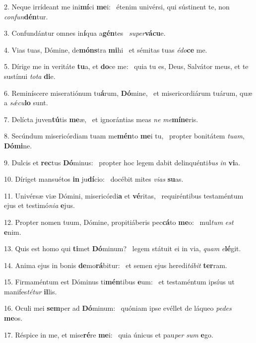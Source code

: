 2. Neque irrídeant me ini\textbf{mí}ci \textbf{me}i: \ast\  étenim univérsi, qui sústinent te, non \textit{con}\textit{fun}\textbf{dén}tur.\

3. Confundántur omnes in\textbf{í}qua a\textbf{gén}tes \ast\  \textit{su}\textit{per}\textbf{vá}\textbf{cu}e.\

4. Vias tuas, Dómine, de\textbf{móns}tra \textbf{mi}hi \ast\  et sémitas tuas \textit{é}\textit{do}\textbf{ce} me.\

5. Dírige me in veritáte \textbf{tu}a, et \textbf{do}ce me: \ast\  quia tu es, Deus, Salvátor meus, et te sustínui \textit{to}\textit{ta} \textbf{di}e.\

6. Reminíscere miseratiónum tu\textbf{á}rum, \textbf{Dó}mine, \ast\  et misericordiárum tuárum, quæ a \textit{sǽ}\textit{cu}\textbf{lo} sunt.\

7. Delícta juven\textbf{tú}tis \textbf{me}æ, \ast\  et ignorántias meas \textit{ne} \textit{me}\textbf{mí}\textbf{ne}ris.\

8. Secúndum misericórdiam tuam me\textbf{mén}to \textbf{me}i tu, \ast\  propter bonitátem \textit{tu}\textit{am}, \textbf{Dó}\textbf{mi}ne.\

9. Dulcis et \textbf{rec}tus \textbf{Dó}minus: \ast\  propter hoc legem dabit delinquénti\textit{bus} \textit{in} \textbf{vi}a.\

10. Díriget mansuétos \textbf{in} ju\textbf{dí}cio: \ast\  docébit mites \textit{vi}\textit{as} \textbf{su}as.\

11. Univérsæ viæ Dómini, misericórdi\textbf{a} et \textbf{vé}ritas, \ast\  requiréntibus testaméntum ejus et testimó\textit{ni}\textit{a} \textbf{e}jus.\

12. Propter nomen tuum, Dómine, propitiáberis pec\textbf{cá}to \textbf{me}o: \ast\  mul\textit{tum} \textit{est} \textbf{e}nim.\

13. Quis est homo qui \textbf{ti}met \textbf{Dó}minum? \ast\  legem státuit ei in via, \textit{quam} \textit{e}\textbf{lé}git.\

14. Anima ejus in bonis \textbf{de}mo\textbf{rá}bitur: \ast\  et semen ejus heredi\textit{tá}\textit{bit} \textbf{ter}ram.\

15. Firmaméntum est Dóminus ti\textbf{mén}tibus \textbf{e}um: \ast\  et testaméntum ipsíus ut manifes\textit{té}\textit{tur} \textbf{il}lis.\

16. Oculi mei \textbf{sem}per ad \textbf{Dó}minum: \ast\  quóniam ipse evéllet de láqueo \textit{pe}\textit{des} \textbf{me}os.\

17. Réspice in me, et mise\textbf{ré}re \textbf{me}i: \ast\  quia únicus et pau\textit{per} \textit{sum} \textbf{e}go.\

